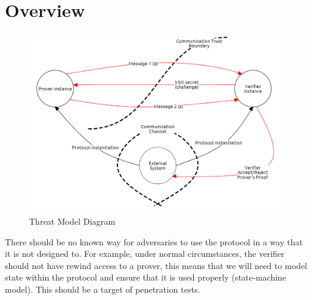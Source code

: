 \section{Overview}

\begin{figure}[h]
    \centering
    \includegraphics[width=\linewidth]{../assets/threat-model.png}
    \caption{Threat Model Diagram}
    \label{fig:threat_model}
\end{figure}

There should be no known way for adversaries to use the protocol in a way that it is not designed to. For example, under normal circumstances, the verifier should not have rewind access to a prover, this means that we will need to model state within the protocol and ensure that it is used properly (state-machine model). This should be a target of penetration tests. 


